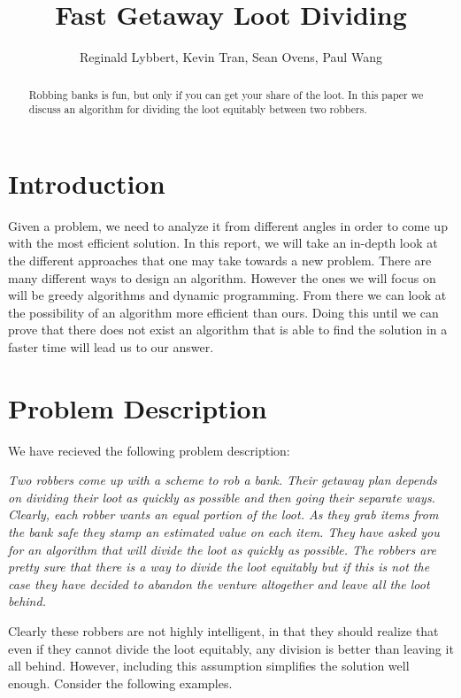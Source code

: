 \documentclass{article}
\title{Fast Getaway Loot Dividing}
\author{Reginald Lybbert, Kevin Tran, Sean Ovens, Paul Wang}
\begin{document}
\maketitle

\begin{abstract}
Robbing banks is fun, but only if you can get your share of the loot.  In this paper we discuss an algorithm for dividing the loot equitably between two robbers.
\end{abstract}
\section{Introduction}


Given a problem, we need to analyze it from different angles in order to come up with the most efficient solution. In this report, we will take an in-depth look at the different approaches that one may take towards a new problem. There are many different ways to design an algorithm. However the ones we will focus on will be greedy algorithms and dynamic programming. From there we can look at the possibility of an algorithm more efficient than ours. Doing this until we can prove that there does not exist an algorithm that is able to find the solution in a faster time will lead us to our answer.

\section{Problem Description}

We have recieved the following problem description:

\textit{
Two robbers come up with a scheme to rob a bank. Their getaway plan depends on dividing their loot
as quickly as possible and then going their separate ways. Clearly, each robber wants an equal portion of
the loot. As they grab items from the bank safe they stamp an estimated value on each item. They have
asked you for an algorithm that will divide the loot as quickly as possible. The robbers are pretty sure
that there is a way to divide the loot equitably but if this is not the case they have decided to abandon
the venture altogether and leave all the loot behind.
}

Clearly these robbers are not highly intelligent, in that they should realize that even if they cannot divide the loot equitably, any division is better than leaving it all behind.  However, including this assumption simplifies the solution well enough.  Consider the following examples. \\
\end{document}
